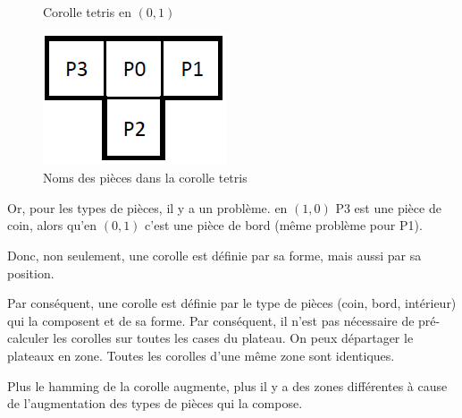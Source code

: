 \begin{exmp}
\begin{figure}[H]
\begin{minipage}{0.33\textwidth}
\begin{center}
					\caption{Corolle tetris en $(0,1)$}\label{fig:corolle_tetris_2}
				\end{center}
			\end{minipage}\hfill
			\begin{minipage}{0.33\textwidth}
				\includegraphics{images/corolle_tetris.png}
				\caption{Noms des pièces dans la corolle tetris}\label{fig:corolle_tetris}
			\end{minipage}\hfill
		\end{figure}
		Or, pour les types de pièces, il y a un problème. en $(1,0)$ P3 est une pièce de coin, alors qu'en $(0,1)$ c'est une pièce de bord (même problème pour P1).
		
		Donc, non seulement, une corolle est définie par sa forme, mais aussi par sa position.
	\end{exmp}
	
	Par conséquent, une corolle est définie par le type de pièces (coin, bord, intérieur) qui la composent et de sa forme. Par conséquent, il n'est pas nécessaire de pré-calculer les corolles sur toutes les cases du plateau. On peux départager le plateaux en zone. Toutes les corolles d'une même zone sont identiques.
	
	\begin{rem}
		Plus le hamming de la corolle augmente, plus il y a des zones différentes à cause de l'augmentation des types de pièces qui la compose.
	\end{rem}
	
